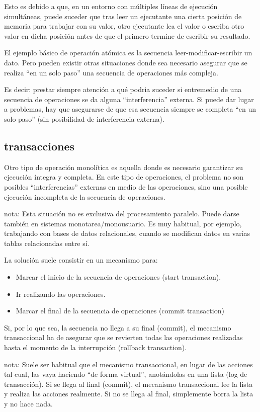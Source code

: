 \documentclass[spanish,12pt,a4paper,final,oneside]{book}
\begin{document}
Esto es debido a que, en un entorno con múltiples líneas de ejecución simultáneas, puede suceder que tras leer un ejecutante una cierta posición de memoria para trabajar con su valor, otro ejecutante lea el valor o escriba otro valor en dicha posición antes de que el primero termine de escribir su resultado. 

El ejemplo básico de operación atómica es la secuencia leer-modificar-escribir un dato. Pero pueden existir otras situaciones donde sea necesario asegurar que se realiza ``en un solo paso'' una secuencia de operaciones más compleja. 

Es decir: prestar siempre atención a qué podria suceder si entremedio de una secuencia de operaciones se da alguna ``interferencia'' externa. Si puede dar lugar a problemas, hay que asegurarse de que esa secuencia siempre se completa ``en un solo paso'' (sin posibilidad de interferencia externa).

\subsection{transacciones}
Otro tipo de operación monolítica es aquella donde es necesario garantizar su ejecución íntegra y completa. En este tipo de operaciones, el problema no son posibles ``interferencias'' externas en medio de las operaciones, sino una posible ejecución incompleta de la secuencia de operaciones.

nota: Esta situación no es exclusiva del procesamiento paralelo. Puede darse también en sistemas monotarea/monousuario. Es muy habitual, por ejemplo, trabajando con bases de datos relacionales, cuando se modifican datos en varias tablas relacionadas entre sí.

La solución suele consistir en un mecanismo para:
\begin{itemize}
\item Marcar el inicio de la secuencia de operaciones (start transaction).
\item Ir realizando las operaciones.
\item Marcar el final de la secuencia de operaciones (commit transaction)
\end{itemize}

Si, por lo que sea, la secuencia no llega a su final (commit), el mecanismo transaccional ha de asegurar que se revierten todas las operaciones realizadas hasta el momento de la interrupción (rollback transaction).

nota: Suele ser habitual que el mecanismo transaccional, en lugar de las acciones tal cual, las vaya haciendo ``de forma virtual'', anotándolas en una lista (log de transacción). Si se llega al final (commit), el mecanismo transaccional lee la lista y realiza las acciones realmente. Si no se llega al final, simplemente borra la lista y no hace nada. 
\end{document}

